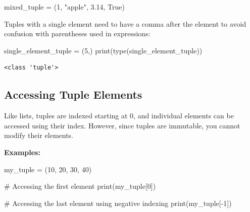 \documentclass[
  letterpaper,
  DIV=11,
  numbers=noendperiod]{scrreprt}
\newenvironment{Shaded}{\begin{snugshade}}{\end{snugshade}}
\newcommand{\BuiltInTok}[1]{\textcolor[rgb]{0.00,0.23,0.31}{#1}}
\newcommand{\CommentTok}[1]{\textcolor[rgb]{0.37,0.37,0.37}{#1}}
\newcommand{\DecValTok}[1]{\textcolor[rgb]{0.68,0.00,0.00}{#1}}
\newcommand{\FloatTok}[1]{\textcolor[rgb]{0.68,0.00,0.00}{#1}}
\newcommand{\NormalTok}[1]{\textcolor[rgb]{0.00,0.23,0.31}{#1}}
\newcommand{\OperatorTok}[1]{\textcolor[rgb]{0.37,0.37,0.37}{#1}}
\newcommand{\StringTok}[1]{\textcolor[rgb]{0.13,0.47,0.30}{#1}}
\newcommand{\VariableTok}[1]{\textcolor[rgb]{0.07,0.07,0.07}{#1}}
\begin{document}
\begin{Shaded}
\begin{Highlighting}[]
\NormalTok{mixed\_tuple }\OperatorTok{=}\NormalTok{ (}\DecValTok{1}\NormalTok{, }\StringTok{"apple"}\NormalTok{, }\FloatTok{3.14}\NormalTok{, }\VariableTok{True}\NormalTok{)}
\end{Highlighting}
\end{Shaded}

Tuples with a single element need to have a comma after the element to
avoid confusion with parentheses used in expressions:

\begin{Shaded}
\begin{Highlighting}[]
\NormalTok{single\_element\_tuple }\OperatorTok{=}\NormalTok{ (}\DecValTok{5}\NormalTok{,)}
\BuiltInTok{print}\NormalTok{(}\BuiltInTok{type}\NormalTok{(single\_element\_tuple))}
\end{Highlighting}
\end{Shaded}

\begin{verbatim}
<class 'tuple'>
\end{verbatim}

\hypertarget{accessing-tuple-elements}{%
\subsection{Accessing Tuple Elements}\label{accessing-tuple-elements}}

Like lists, tuples are indexed starting at 0, and individual elements
can be accessed using their index. However, since tuples are immutable,
you cannot modify their elements.

\textbf{Examples:}

\begin{Shaded}
\begin{Highlighting}[]
\NormalTok{my\_tuple }\OperatorTok{=}\NormalTok{ (}\DecValTok{10}\NormalTok{, }\DecValTok{20}\NormalTok{, }\DecValTok{30}\NormalTok{, }\DecValTok{40}\NormalTok{)}

\CommentTok{\# Accessing the first element}
\BuiltInTok{print}\NormalTok{(my\_tuple[}\DecValTok{0}\NormalTok{]) }

\CommentTok{\# Accessing the last element using negative indexing}
\BuiltInTok{print}\NormalTok{(my\_tuple[}\OperatorTok{{-}}\DecValTok{1}\NormalTok{]) }
\end{Highlighting}
\end{Shaded}
\end{document}
